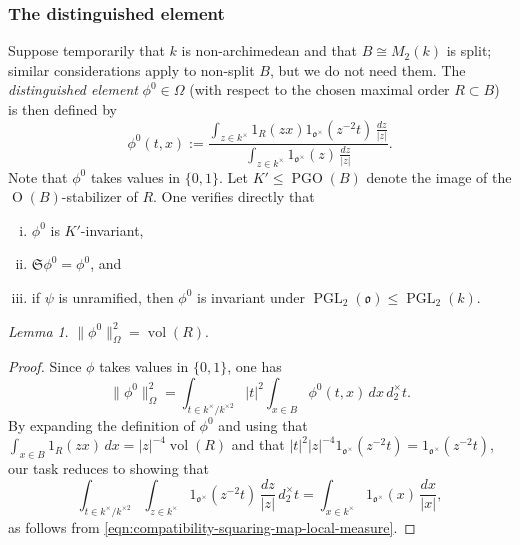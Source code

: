 \documentclass[reqno,10pt]{amsart}
\theoremstyle{plain} %
\theoremstyle{definition}
\theoremstyle{plain} %
\theoremstyle{remark}
\theoremstyle{itplain} %
\newtheorem{lemma}{Lemma}
\theoremstyle{remark} %
\renewcommand{\leq}{\leqslant}
\numberwithin{equation}{section}
\DeclareMathOperator{\PGO}{PGO}
\def\PGL{\operatorname{PGL}}
\def\O{\operatorname{O}}
\DeclareMathOperator{\vol}{vol}
\begin{document}
\subsubsection{The distinguished element}\label{sec:dist-elem}
Suppose temporarily that $k$ is non-archimedean and that $B \cong M_2(k)$ is split; similar considerations apply to non-split $B$, but we do not need them.  The \emph{distinguished element} $\phi^0 \in \Omega$ (with respect to the chosen maximal order $R \subset B$) is then defined by
\begin{equation}
  \phi^0(t,x)
  :=
  \frac{
    \int_{z \in k^\times}
    1_{R}(z x)
    1_{\mathfrak{o}^\times}(z^{-2} t)
    \, \frac{d z}{|z|}
  }
  {
    \int_{z \in k^\times}
    1_{\mathfrak{o}^\times}(z)
    \, \frac{d z}{|z|}
  }.
\end{equation}
Note that $\phi^0$ takes values in $\{0,1\}$.  Let $K' \leq \PGO(B)$ denote the image of the $\O(B)$-stabilizer of $R$.  One verifies directly that
\begin{enumerate}[(i)]
\item $\phi^0$ is $K'$-invariant,
\item $\mathfrak{S} \phi^0 = \phi^0$, and
\item if $\psi$ is unramified, then $\phi^0$ is invariant under $\PGL_2(\mathfrak{o}) \leq \PGL_2(k)$.
\end{enumerate}

\begin{lemma}\label{lem:norm-of-distinguished-vector-in-Omega-local}
  $\|\phi^0\|^2_{\Omega} = \vol(R)$.
\end{lemma}
\begin{proof}
  Since $\phi$ takes values in $\{0 ,1\}$, one has
  \begin{equation*}
    \|\phi^0\|^2_{\Omega} = \int_{t \in k^\times / k^{\times 2}} |t|^2 \int_{x \in B} \phi^0(t,x)
    \, d x \, d_2^\times t.
\end{equation*}
By expanding the definition of $\phi^0$ and using that $\int_{x \in B} 1_R(z x) \,d x = |z|^{-4} \vol(R)$ and that $|t|^2 |z|^{-4} 1_{\mathfrak{o}^\times}(z^{-2} t) = 1_{\mathfrak{o}^\times}(z^{-2} t)$, our task reduces to showing that
\begin{equation*}
\int_{t \in k^\times / k^{\times 2}} \int_{z \in k^\times} 1_{\mathfrak{o}^\times}(z^{-2} t) \, \frac{d z}{|z|} \, d_2^\times t = \int_{x \in k^\times} 1_{\mathfrak{o}^\times}(x) \, \frac{d x}{|x|},
\end{equation*}
as follows from \eqref{eqn:compatibility-squaring-map-local-measure}.
\end{proof}
\end{document}

